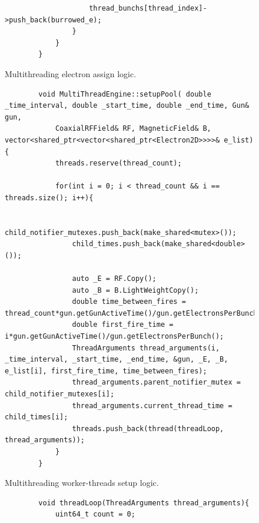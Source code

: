 \documentclass[a4paper,oneside,12pt]{report}
\numberwithin{equation}{chapter}
\begin{document}
{\begin{figure}[H]
\begin{verbatim}
                    thread_bunchs[thread_index]->push_back(burrowed_e);
                }
            }
        }
    \end{verbatim}
    \vspace{0pt}
    \caption{Multithreading electron assign logic.}
    \label{fig:fireAllWithFireTimesMT}
\end{figure}

\begin{figure}[H]
    \centering
    \begin{verbatim}
        void MultiThreadEngine::setupPool( double _time_interval, double _start_time, double _end_time, Gun& gun, 
            CoaxialRFField& RF, MagneticField& B, vector<shared_ptr<vector<shared_ptr<Electron2D>>>>& e_list){
            threads.reserve(thread_count);
        
            for(int i = 0; i < thread_count && i == threads.size(); i++){
        
                child_notifier_mutexes.push_back(make_shared<mutex>());
                child_times.push_back(make_shared<double>());
                
                auto _E = RF.Copy();
                auto _B = B.LightWeightCopy();
                double time_between_fires = thread_count*gun.getGunActiveTime()/gun.getElectronsPerBunch();
                double first_fire_time = i*gun.getGunActiveTime()/gun.getElectronsPerBunch();
                ThreadArguments thread_arguments(i, _time_interval, _start_time, _end_time, &gun, _E, _B, e_list[i], first_fire_time, time_between_fires);
                thread_arguments.parent_notifier_mutex = child_notifier_mutexes[i];
                thread_arguments.current_thread_time = child_times[i];
                threads.push_back(thread(threadLoop, thread_arguments));
            }
        }
    \end{verbatim}
    \vspace{0pt}
    \caption{Multithreading worker-threads setup logic.}
    \label{fig:setupPool}
\end{figure}

\vspace{5pt}
\begin{figure}[H]
    \centering
    \begin{verbatim}
        void threadLoop(ThreadArguments thread_arguments){
            uint64_t count = 0;
        

\end{verbatim}
\end{figure}}
\end{document}
